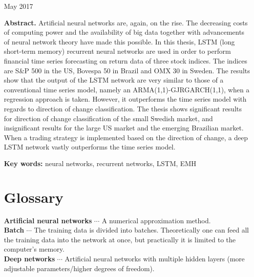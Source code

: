 \documentclass[12pt, letterpaper]{amsart}%
\begin{document}
\begin{titlepage}
\begin{center}
\vspace{1cm}

\large{May 2017}
\end{center}

\vspace{1cm}

\small{\textbf{Abstract.} Artificial neural networks are, again, on the rise. The decreasing costs of computing power and the availability of big data together with advancements of neural network theory have made this possible. In this thesis, LSTM (long short-term memory) recurrent neural networks are used in order to perform financial time series forecasting on return data of three stock indices. The indices are S\&P 500 in the US, Bovespa 50 in Brazil and OMX 30 in Sweden. The results show that the output of the LSTM network are very similar to those of a conventional time series model, namely an ARMA(1,1)-GJRGARCH(1,1), when a regression approach is taken. However, it outperforms the time series model with regards to direction of change classification. The thesis shows significant results for direction of change classification of the small Swedish market, and insignificant results for the large US market and the emerging Brazilian market. When a trading strategy is implemented based on the direction of change, a deep LSTM network vastly outperforms the time series model.}

\vfill

\small{\textbf{Key words:} neural networks, recurrent networks, LSTM, EMH}
\end{titlepage}

\newpage


\newpage
\tableofcontents
\newpage

\section*{Glossary}
\noindent
\textbf{Artificial neural networks} $\cdots$ A numerical approximation method.
\\

\noindent
\textbf{Batch} $\cdots$ The training data is divided into batches. Theoretically one can feed all the training data into the network at once, but practically it is limited to the computer's memory.
\\

\noindent
\textbf{Deep networks} $\cdots$ Artificial neural networks with multiple hidden layers (more adjustable parameters/higher degrees of freedom).
\\
\end{document}
